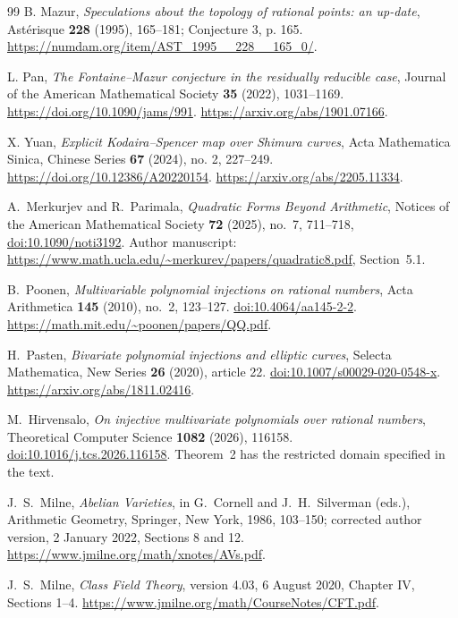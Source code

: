 \documentclass[11pt]{article}
\theoremstyle{definition}
\begin{document}
\begin{thebibliography}{99}
B. Mazur, \emph{Speculations about the topology of rational points:
an up-date}, Ast\'erisque \textbf{228} (1995), 165--181;
Conjecture 3, p. 165.
\url{https://numdam.org/item/AST_1995__228__165_0/}.

L. Pan, \emph{The Fontaine--Mazur conjecture in the residually
reducible case}, Journal of the American Mathematical Society
\textbf{35} (2022), 1031--1169.
\url{https://doi.org/10.1090/jams/991}.
\url{https://arxiv.org/abs/1901.07166}.

X. Yuan, \emph{Explicit Kodaira--Spencer map over Shimura curves},
Acta Mathematica Sinica, Chinese Series \textbf{67} (2024), no. 2,
227--249. \url{https://doi.org/10.12386/A20220154}.
\url{https://arxiv.org/abs/2205.11334}.

A.~Merkurjev and R.~Parimala,
\emph{Quadratic Forms Beyond Arithmetic},
Notices of the American Mathematical Society \textbf{72} (2025), no.~7,
711--718, \href{https://doi.org/10.1090/noti3192}{doi:10.1090/noti3192}.
Author manuscript:
\url{https://www.math.ucla.edu/~merkurev/papers/quadratic8.pdf}, Section~5.1.


B.~Poonen, \emph{Multivariable polynomial injections on rational numbers},
Acta Arithmetica \textbf{145} (2010), no.~2, 123--127.
\href{https://doi.org/10.4064/aa145-2-2}{doi:10.4064/aa145-2-2}.
\url{https://math.mit.edu/~poonen/papers/QQ.pdf}.

H.~Pasten, \emph{Bivariate polynomial injections and elliptic curves},
Selecta Mathematica, New Series \textbf{26} (2020), article 22.
\href{https://doi.org/10.1007/s00029-020-0548-x}{doi:10.1007/s00029-020-0548-x}.
\url{https://arxiv.org/abs/1811.02416}.

M.~Hirvensalo, \emph{On injective multivariate polynomials over rational
numbers}, Theoretical Computer Science \textbf{1082} (2026), 116158.
\href{https://doi.org/10.1016/j.tcs.2026.116158}{doi:10.1016/j.tcs.2026.116158}.
Theorem~2 has the restricted domain specified in the text.

J.~S.~Milne, \emph{Abelian Varieties}, in G.~Cornell and J.~H.~Silverman
(eds.), Arithmetic Geometry, Springer, New York, 1986, 103--150;
corrected author version, 2 January 2022, Sections 8 and 12.
\url{https://www.jmilne.org/math/xnotes/AVs.pdf}.


J.~S.~Milne, \emph{Class Field Theory}, version 4.03,
6 August 2020, Chapter IV, Sections 1--4.
\url{https://www.jmilne.org/math/CourseNotes/CFT.pdf}.


\end{thebibliography}
\end{document}

